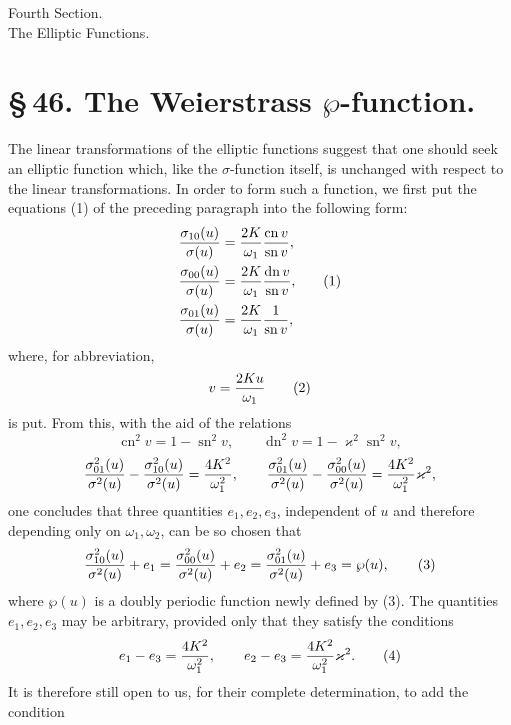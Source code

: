 \documentclass[11pt]{article}
\providecommand{\sn}{\operatorname{sn}}
\providecommand{\cn}{\operatorname{cn}}
\providecommand{\dn}{\operatorname{dn}}
\begin{document}
\begin{center}
{\large Fourth Section.}\\[0.7em]
{\Large The Elliptic Functions.}
\end{center}

\section*{\S\,46. The Weierstrass $\wp$-function.}

The linear transformations of the elliptic functions suggest that one should seek an elliptic function which, like the $\sigma$-function itself, is unchanged with respect to the linear transformations. In order to form such a function, we first put the equations (1) of the preceding paragraph into the following form:
\begin{equation}
\begin{aligned}
{\sigma_{10}(u)\over\sigma(u)}&={2K\over\omega_1}{\cn v\over\sn v},\\
{\sigma_{00}(u)\over\sigma(u)}&={2K\over\omega_1}{\dn v\over\sn v},\\
{\sigma_{01}(u)\over\sigma(u)}&={2K\over\omega_1}{1\over\sn v},
\end{aligned}
\tag{1}
\end{equation}
where, for abbreviation,
\begin{equation}
 v={2Ku\over\omega_1}
\tag{2}
\end{equation}
is put. From this, with the aid of the relations
\[
\cn^2v=1-\sn^2v,
\qquad
\dn^2v=1-\varkappa^2\sn^2v,
\]
\[
{\sigma_{01}^2(u)\over\sigma^2(u)}-{\sigma_{10}^2(u)\over\sigma^2(u)}={4K^2\over\omega_1^2},
\qquad
{\sigma_{01}^2(u)\over\sigma^2(u)}-{\sigma_{00}^2(u)\over\sigma^2(u)}={4K^2\over\omega_1^2}\varkappa^2,
\]
one concludes that three quantities $e_1,e_2,e_3$, independent of $u$ and therefore depending only on $\omega_1,\omega_2$, can be so chosen that
\begin{equation}
{\sigma_{10}^2(u)\over\sigma^2(u)}+e_1
={\sigma_{00}^2(u)\over\sigma^2(u)}+e_2
={\sigma_{01}^2(u)\over\sigma^2(u)}+e_3
=\wp(u),
\tag{3}
\end{equation}
where $\wp(u)$ is a doubly periodic function newly defined by (3). The quantities $e_1,e_2,e_3$ may be arbitrary, provided only that they satisfy the conditions
\begin{equation}
 e_1-e_3={4K^2\over\omega_1^2},
 \qquad
 e_2-e_3={4K^2\over\omega_1^2}\varkappa^2.
\tag{4}
\end{equation}
It is therefore still open to us, for their complete determination, to add the condition
\end{document}
